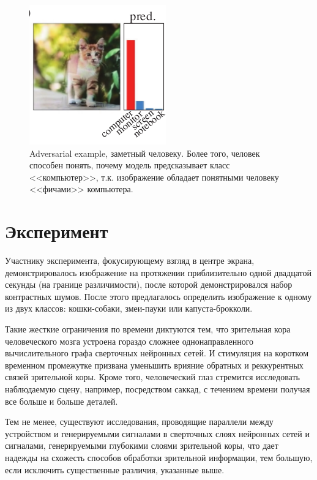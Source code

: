 \documentclass[a4paper,12pt]{article}
\begin{document}
\begin{figure}[h]
\centering
\includegraphics[width=0.3\linewidth]{cat.png}
\caption{Adversarial example, заметный человеку. Более того, человек способен понять, почему модель предсказывает класс <<компьютер>>, т.к. изображение обладает понятными человеку <<фичами>> компьютера.}
\label{fig:cat}
\end{figure}

\section{Эксперимент}
Участнику эксперимента, фокусирующему взгляд в центре экрана, демонстрировалось изображение на протяжении приблизительно одной двадцатой секунды (на границе различимости), после которой демонстрировался набор контрастных шумов. После этого предлагалось определить изображение к одному из двух классов: кошки-собаки, змеи-пауки или капуста-брокколи.

Такие жесткие ограничения по времени диктуются тем, что зрительная кора человеческого мозга устроена гораздо сложнее однонаправленного вычислительного графа сверточных нейронных сетей. И стимуляция на коротком временном промежутке призвана уменьшить врияние обратных и реккурентных связей зрительной коры. Кроме того, человеческий глаз стремится исследовать наблюдаемую сцену, например, посредством саккад, с течением времени получая все больше и больше деталей.

Тем не менее, существуют исследования, проводящие параллели между устройством и генерируемыми сигналами в сверточных слоях нейронных сетей и сигналами, генерируемыми глубокими слоями зрительной коры, что дает надежды на схожесть способов обработки зрительной информации, тем большую, если исключить существенные различия, указанные выше.
\end{document}
